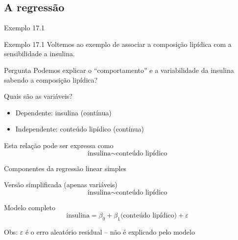 \documentclass{beamer}
\begin{document}
\subsection{A regressão}

\begin{frame}{Exemplo 17.1}
  \begin{exampleblock}{Exemplo 17.1}
    Voltemos ao exemplo de associar a composição lipídica com a sensibilidade a insulina.    
  \end{exampleblock}
  \begin{block}{Pergunta}
    Podemos explicar o ``comportamento'' e a variabilidade da insulina sabendo a composição lipídica?
  \end{block}
\end{frame}

\begin{frame}{Quais são as variáveis?}
  \begin{itemize}
  \item Dependente: insulina (contínua)
  \item Independente: conteúdo lipídico (contínua)
  \end{itemize}
  \vfill
  \begin{block}{Esta relação pode ser expressa como}
    \begin{displaymath}
      \text{insulina} \sim \text{conteúdo lipídico}
    \end{displaymath}
  \end{block}
\end{frame}

\begin{frame}{\small Componentes da regressão linear simples}
  \begin{block}{\footnotesize Versão simplificada (apenas variáveis)}
    \footnotesize
    \begin{displaymath}
      \text{insulina} \sim \text{conteúdo lipídico}
    \end{displaymath}
  \end{block}
  \bigskip
  \bigskip
  \begin{block}{Modelo completo}
    \begin{displaymath}
      \text{insulina} =\beta_0 + \beta_1 \text{(conteúdo lipídico)} + \varepsilon
    \end{displaymath}
  \end{block}
  \vfill
  \small
  Obs: $\varepsilon$ é o erro aleatório residual -- não é explicado pelo modelo
\end{frame}
\end{document}
